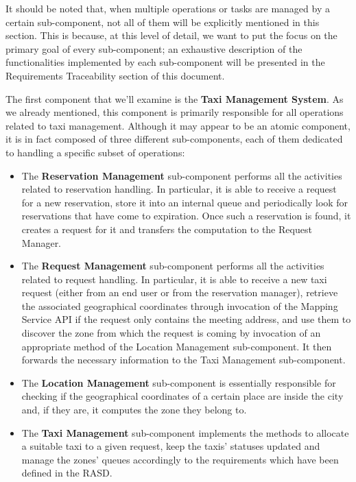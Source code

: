 It should be noted that, when multiple operations or tasks are managed by a certain sub-component, not all of them will be explicitly mentioned in this section. This is because, at this level of detail, we want to put the focus on the primary goal of every sub-component; an exhaustive description of the functionalities implemented by each sub-component will be presented in the Requirements Traceability section of this document. 

The first component that we'll examine is the \textbf{Taxi Management System}. As we already mentioned, this component is primarily responsible for all operations related to taxi management. Although it may appear to be an atomic component, it is in fact composed of three different sub-components, each of them dedicated to handling a specific subset of operations:
	\begin{itemize}
		\item The \textbf{Reservation Management} sub-component performs all the activities related to reservation handling. In particular, it is able to receive a request for a new reservation, store it into an internal queue and periodically look for reservations that have come to expiration. Once such a reservation is found, it creates a request for it and transfers the computation to the Request Manager.
		\item The \textbf{Request Management} sub-component performs all the activities related to request handling. In particular, it is able to receive a new taxi request (either from an end user or from the reservation manager), retrieve the associated geographical coordinates through invocation of the Mapping Service API if the request only contains the meeting address, and use them to discover the zone from which the request is coming by invocation of an appropriate method of the Location Management sub-component. It then forwards the necessary information to the Taxi Management sub-component.
		\item The \textbf{Location Management} sub-component is essentially responsible for checking if the geographical coordinates of a certain place are inside the city and, if they are, it computes the zone they belong to. 
		\item The \textbf{Taxi Management} sub-component implements the methods to allocate a suitable taxi to a given request, keep the taxis' statuses updated and manage the zones' queues accordingly to the requirements which have been defined in the RASD.
	\end{itemize}
	
